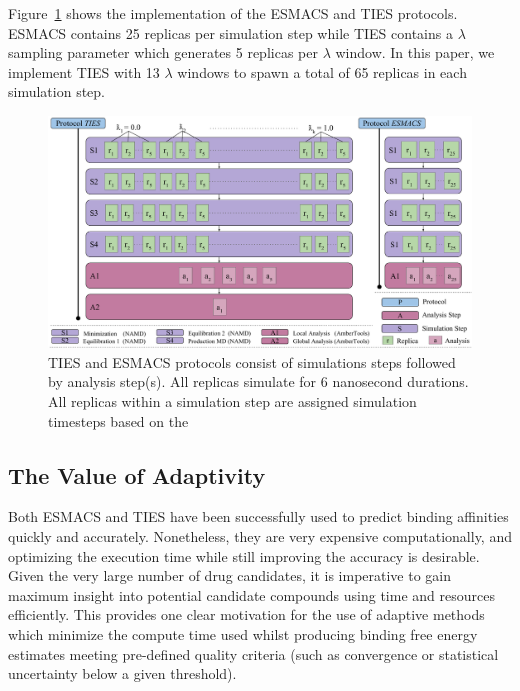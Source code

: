 
Figure~\ref{fig:ties_esmacs_application} shows the implementation of the
ESMACS and TIES protocols. ESMACS contains 25 replicas per simulation step
while TIES contains a $\lambda$ sampling parameter which generates 5 replicas
per $\lambda$ window. In this paper, we implement TIES with 13 $\lambda$
windows to spawn a total of 65 replicas in each simulation step.

\begin{figure}
  \centering
  \includegraphics[width=\columnwidth]{figures/ties_esmacs_application_model.pdf}
  \caption{TIES and ESMACS protocols consist of simulations steps followed
  by analysis step(s). All replicas simulate for 6 nanosecond durations. 
  All replicas within a simulation step are assigned simulation timesteps 
  based on the }
\label{fig:ties_esmacs_application}
\end{figure}


\subsection{The Value of Adaptivity}

Both ESMACS and TIES have been successfully used to predict binding affinities
quickly and accurately. Nonetheless, they are very expensive computationally,
and optimizing the execution time while still improving the accuracy is
desirable. Given the very large number of drug candidates, it is imperative to
gain maximum insight into potential candidate compounds using time and
resources efficiently. This provides one clear motivation for the use of
adaptive methods which minimize the compute time used whilst producing binding
free energy estimates meeting pre-defined quality criteria (such as
convergence or statistical uncertainty below a given threshold).
  
